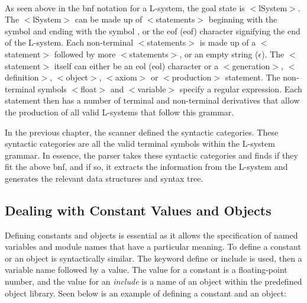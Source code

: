 \begin{singlespace}
\begin{bnf*}
		{}\\
		{}\\
		{\bnfts{==} \bnfor \bnfts{!=} \bnfor \bnfts{$<=$} \bnfor \bnfts{$>=$} \bnfor \bnfts{$>$} \bnfor \bnfts{$<$}}\\
		{}\\
		{\bnfes \bnfor {} }\\
		{}\\
	\end{bnf*}

\newpage

\end{singlespace} 

\noindent
As seen above in the \acrshort{bnf} notation for a L-system, the goal state is $<$lSystem$>$. The $<$lSystem$>$ can be made up of $<$statements$>$ beginning with the symbol \say{\#} and ending with the symbol \say{;}, or the \acrlong{eof} (\acrshort{eof}) character signifying the end of the L-system. Each non-terminal $<$statements$>$ is made up of a $<$statement$>$ followed by more $<$statements$>$, or an empty string ($\epsilon$). The $<$statement$>$ itself can either be an \acrlong{eol} (\acrshort{eol}) character or a $<$generation$>$, $<$definition$>$, $<$object$>$, $<$axiom$>$ or $<$production$>$ statement. The non-terminal symbols $<$float$>$ and $<$variable$>$ specify a regular expression. Each statement then has a number of terminal and non-terminal derivatives that allow the production of all valid L-systems that follow this grammar. 

In the previous chapter, the scanner defined the syntactic categories. These syntactic categories are all the valid terminal symbols within the L-system grammar. In essence, the parser takes these syntactic categories and finds if they fit the above \acrshort{bnf}, and if so, it extracts the information from the L-system and generates the relevant data structures and syntax tree. 

\subsection{Dealing with Constant Values and Objects} \label{constants subsection}

Defining constants and objects is essential as it allows the specification of named variables and module names that have a particular meaning. To define a constant or an object is syntactically similar. The keyword define or include is used, then a variable name followed by a value. The value for a constant is a floating-point number, and the value for an \textit{include} is a name of an object within the predefined object library. Seen below is an example of defining a constant and an object: 

